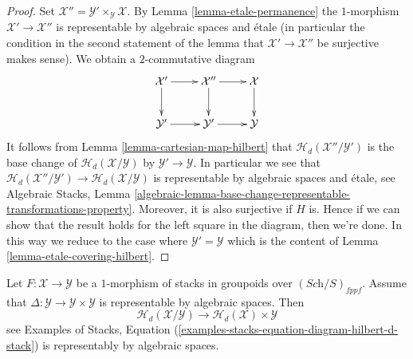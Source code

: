 \begin{proof}
Set $\mathcal{X}'' = \mathcal{Y}' \times_{\mathcal{Y}} \mathcal{X}$. By
Lemma \ref{lemma-etale-permanence}
the $1$-morphism $\mathcal{X}' \to \mathcal{X}''$ is representable by
algebraic spaces and \'etale (in particular the condition in the second
statement of the lemma that $\mathcal{X}' \to \mathcal{X}''$ be surjective
makes sense). We obtain a $2$-commutative diagram
$$
\xymatrix{
\mathcal{X}' \ar[r] \ar[d] &
\mathcal{X}'' \ar[r] \ar[d] &
\mathcal{X} \ar[d] \\
\mathcal{Y}' \ar[r] &
\mathcal{Y}' \ar[r] &
\mathcal{Y}
}
$$
It follows from
Lemma \ref{lemma-cartesian-map-hilbert}
that $\mathcal{H}_d(\mathcal{X}''/\mathcal{Y}')$ is the base change
of $\mathcal{H}_d(\mathcal{X}/\mathcal{Y})$ by $\mathcal{Y}' \to \mathcal{Y}$.
In particular we see that
$\mathcal{H}_d(\mathcal{X}''/\mathcal{Y}') \to
\mathcal{H}_d(\mathcal{X}/\mathcal{Y})$ is
representable by algebraic spaces and \'etale, see
Algebraic Stacks, Lemma
\ref{algebraic-lemma-base-change-representable-transformations-property}.
Moreover, it is also surjective if $H$ is.
 Hence if we can show that
the result holds for the left square in the diagram, then we're done.
In this way we reduce to the case where $\mathcal{Y}' = \mathcal{Y}$
which is the content of
Lemma \ref{lemma-etale-covering-hilbert}.
\end{proof}

\begin{lemma}
\label{lemma-relative-hilbert}
Let $F : \mathcal{X} \to \mathcal{Y}$ be a $1$-morphism of stacks in groupoids
over $(\textit{Sch}/S)_{fppf}$. Assume that
$\Delta : \mathcal{Y} \to \mathcal{Y} \times \mathcal{Y}$
is representable by algebraic spaces. Then
$$
\mathcal{H}_d(\mathcal{X}/\mathcal{Y})
\longrightarrow
\mathcal{H}_d(\mathcal{X}) \times \mathcal{Y}
$$
see
Examples of Stacks, Equation
(\ref{examples-stacks-equation-diagram-hilbert-d-stack})
is representably by algebraic spaces.
\end{lemma}

